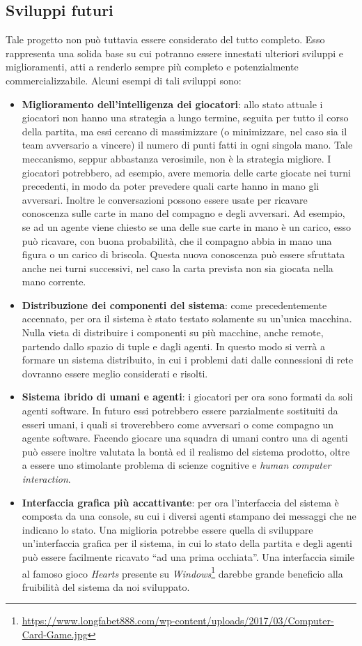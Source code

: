 \documentclass[a4paper,12pt]{article}
\begin{document}
\subsection{Sviluppi futuri}
Tale progetto non può tuttavia essere considerato del tutto completo. Esso rappresenta una solida base su cui potranno essere innestati ulteriori sviluppi e miglioramenti, atti a renderlo sempre più completo e potenzialmente commercializzabile. Alcuni esempi di tali sviluppi sono:
\begin{itemize}
	\item \textbf{Miglioramento dell'intelligenza dei giocatori}: allo stato attuale i giocatori non hanno una strategia a lungo termine, seguita per tutto il corso della partita, ma essi cercano di massimizzare (o minimizzare, nel caso sia il team avversario a vincere) il numero di punti fatti in ogni singola mano. Tale meccanismo, seppur abbastanza verosimile, non è la strategia migliore. I giocatori potrebbero, ad esempio, avere memoria delle carte giocate nei turni precedenti, in modo da poter prevedere quali carte hanno in mano gli avversari. Inoltre le conversazioni possono essere usate per ricavare conoscenza sulle carte in mano del compagno e degli avversari. Ad esempio, se ad un agente viene chiesto se una delle sue carte in mano è un carico, esso può ricavare, con buona probabilità, che il compagno abbia in mano una figura o un carico di briscola. Questa nuova conoscenza può essere sfruttata anche nei turni successivi, nel caso la carta prevista non sia giocata nella mano corrente.
	\item \textbf{Distribuzione dei componenti del sistema}: come precedentemente accennato, per ora il sistema è stato testato solamente su un'unica macchina. Nulla vieta di distribuire i componenti su più macchine, anche remote, partendo dallo spazio di tuple e dagli agenti. In questo modo si verrà a formare un sistema distribuito, in cui i problemi dati dalle connessioni di rete dovranno essere meglio considerati e risolti. 
	\item \textbf{Sistema ibrido di umani e agenti}: i giocatori per ora sono formati da soli agenti software. In futuro essi potrebbero essere parzialmente sostituiti da esseri umani, i quali si troverebbero come avversari o come compagno un agente software. Facendo giocare una squadra di umani contro una di agenti può essere inoltre valutata la bontà ed il realismo del sistema prodotto, oltre a essere uno stimolante problema di scienze cognitive e \emph{human computer interaction}.
	\item \textbf{Interfaccia grafica più accattivante}: per ora l'interfaccia del sistema è composta da una console, su cui i diversi agenti stampano dei messaggi che ne indicano lo stato. Una miglioria potrebbe essere quella di sviluppare un'interfaccia grafica per il sistema, in cui lo stato della partita e degli agenti può essere facilmente ricavato ``ad una prima occhiata''. Una interfaccia simile al famoso gioco \emph{Hearts} presente su \emph{Windows}\footnote{\url{https://www.longfabet888.com/wp-content/uploads/2017/03/Computer-Card-Game.jpg}} darebbe grande beneficio alla fruibilità del sistema da noi sviluppato.
\end{itemize}
\fancyhead{}
\renewcommand{\headrulewidth}{0pt}
\appendix
{}
\end{document}
